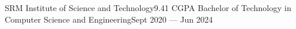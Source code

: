 \hTable
{SRM Institute of Science and Technology}{9.41 CGPA}
{Bachelor of Technology in Computer Science and Engineering}{Sept 2020 --- Jun 2024}